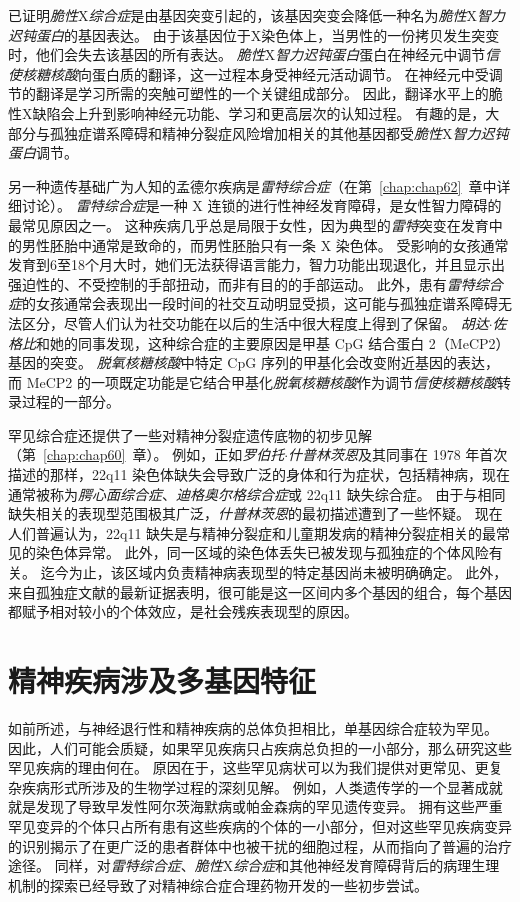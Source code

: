 已证明\textit{脆性}X\textit{综合症}是由基因突变引起的，该基因突变会降低一种名为\textit{脆性}X\textit{智力迟钝蛋白}的基因表达。
由于该基因位于X染色体上，当男性的一份拷贝发生突变时，他们会失去该基因的所有表达。
\textit{脆性}X\textit{智力迟钝蛋白}蛋白在神经元中调节\textit{信使核糖核酸}向蛋白质的翻译，这一过程本身受神经元活动调节。
在神经元中受调节的翻译是学习所需的突触可塑性的一个关键组成部分。
因此，翻译水平上的脆性X缺陷会上升到影响神经元功能、学习和更高层次的认知过程。
有趣的是，大部分与孤独症谱系障碍和精神分裂症风险增加相关的其他基因都受\textit{脆性}X\textit{智力迟钝蛋白}调节。


另一种遗传基础广为人知的孟德尔疾病是\textit{雷特综合症}（在第~\ref{chap:chap62}~章中详细讨论）。
\textit{雷特综合症}是一种 X 连锁的进行性神经发育障碍，是女性智力障碍的最常见原因之一。
这种疾病几乎总是局限于女性，因为典型的\textit{雷特}突变在发育中的男性胚胎中通常是致命的，而男性胚胎只有一条 X 染色体。
受影响的女孩通常发育到6至18个月大时，她们无法获得语言能力，智力功能出现退化，并且显示出强迫性的、不受控制的手部扭动，而非有目的的手部运动。
此外，患有\textit{雷特综合症}的女孩通常会表现出一段时间的社交互动明显受损，这可能与孤独症谱系障碍无法区分，尽管人们认为社交功能在以后的生活中很大程度上得到了保留。
\textit{胡达$\cdot$佐格比}和她的同事发现，这种综合症的主要原因是甲基 CpG 结合蛋白 2（MeCP2）基因的突变。
\textit{脱氧核糖核酸}中特定 CpG 序列的甲基化会改变附近基因的表达，而 MeCP2 的一项既定功能是它结合甲基化\textit{脱氧核糖核酸}作为调节\textit{信使核糖核酸}转录过程的一部分。


罕见综合症还提供了一些对精神分裂症遗传底物的初步见解（第~\ref{chap:chap60}~章）。
例如，正如\textit{罗伯托$\cdot$什普林茨恩}及其同事在 1978 年首次描述的那样，22q11 染色体缺失会导致广泛的身体和行为症状，包括精神病，现在通常被称为\textit{腭心面综合症}、\textit{迪格奥尔格综合症}或 22q11 缺失综合症。
由于与相同缺失相关的表现型范围极其广泛，\textit{什普林茨恩}的最初描述遭到了一些怀疑。
现在人们普遍认为，22q11 缺失是与精神分裂症和儿童期发病的精神分裂症相关的最常见的染色体异常。
此外，同一区域的染色体丢失已被发现与孤独症的个体风险有关。
迄今为止，该区域内负责精神病表现型的特定基因尚未被明确确定。
此外，来自孤独症文献的最新证据表明，很可能是这一区间内多个基因的组合，每个基因都赋予相对较小的个体效应，是社会残疾表现型的原因。



\section{精神疾病涉及多基因特征}

如前所述，与神经退行性和精神疾病的总体负担相比，单基因综合症较为罕见。
因此，人们可能会质疑，如果罕见疾病只占疾病总负担的一小部分，那么研究这些罕见疾病的理由何在。
原因在于，这些罕见病状可以为我们提供对更常见、更复杂疾病形式所涉及的生物学过程的深刻见解。
例如，人类遗传学的一个显著成就就是发现了导致早发性阿尔茨海默病或帕金森病的罕见遗传变异。
拥有这些严重罕见变异的个体只占所有患有这些疾病的个体的一小部分，但对这些罕见疾病变异的识别揭示了在更广泛的患者群体中也被干扰的细胞过程，从而指向了普遍的治疗途径。
同样，对\textit{雷特综合症}、\textit{脆性}X\textit{综合症}和其他神经发育障碍背后的病理生理机制的探索已经导致了对精神综合症合理药物开发的一些初步尝试。


